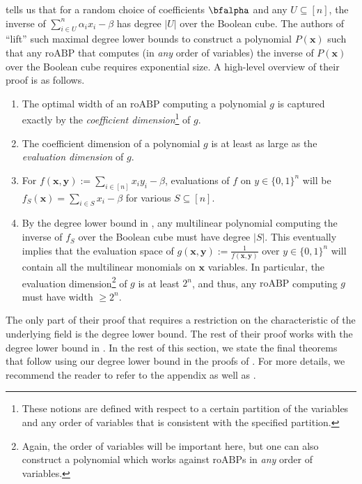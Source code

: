 \documentclass[11pt]{article}
\newcommand{\Boo}{\{0,1 \}}
\newcommand{\roABP}{\mathrm{roABP}}
\begin{document}
  tells us that for a random choice of coefficients $\bfalpha$ and any $U\subseteq [n]$, the inverse of $\sum_{i\in U}^n \alpha_ix_i - \beta$ has degree $|U|$ over the Boolean cube. The authors of \cite{FSTW21} ``lift'' such maximal degree lower bounds to construct a polynomial $P(\mathbf{x})$ such that any $\roABP$ that computes (in \emph{any} order of variables) the inverse of $P(\mathbf{x})$ over the Boolean cube requires exponential size. A high-level overview of their proof is as follows. 
 \begin{enumerate}
     \item The optimal width of an $\roABP$ computing a polynomial $g$ is captured exactly by the \emph{coefficient dimension}\footnote{These notions are defined with respect to a certain partition of the variables and any order of variables that is consistent with the specified partition.} of $g$. 
     \item The coefficient dimension of a polynomial $g$ is at least as large as the \emph{evaluation dimension} of $g$. 
     \item For $f(\mathbf{x},\mathbf{y}) := \sum_{i\in [n]}x_iy_i - \beta$, evaluations of $f$ on $y\in \Boo^n$ will be $f_S(\mathbf{x}) = \sum_{i\in S} x_i - \beta$ for various $S\subseteq [n]$. 
     \item By the degree lower bound in \cite{FSTW21}, any multilinear polynomial computing the inverse of $f_S$ over the Boolean cube must have degree $|S|$. This eventually implies that the evaluation space of $g(\mathbf{x},\mathbf{y}):= \frac{1}{f(\mathbf{x},\mathbf{y})}$ over $y \in \Boo^n$ will contain all the multilinear monomials on $\mathbf{x}$ variables. In particular, the evaluation dimension\footnote{Again, the order of variables will be important here, but one can also construct a polynomial which works against $\roABP$s in \emph{any} order of variables.} of $g$ is at least $2^n$, and thus, any $\roABP$ computing $g$ must have width $\geq 2^n$.
 \end{enumerate}
 The only part of their proof that requires a restriction on the characteristic of the underlying field is the degree lower bound. The rest of their proof works with the degree lower bound in . In the rest of this section, we state the final theorems that follow using our degree lower bound in the proofs of \cite{FSTW21}. For more details, we recommend the reader to refer to the appendix as well as \cite{FSTW21}. 
\end{document}
